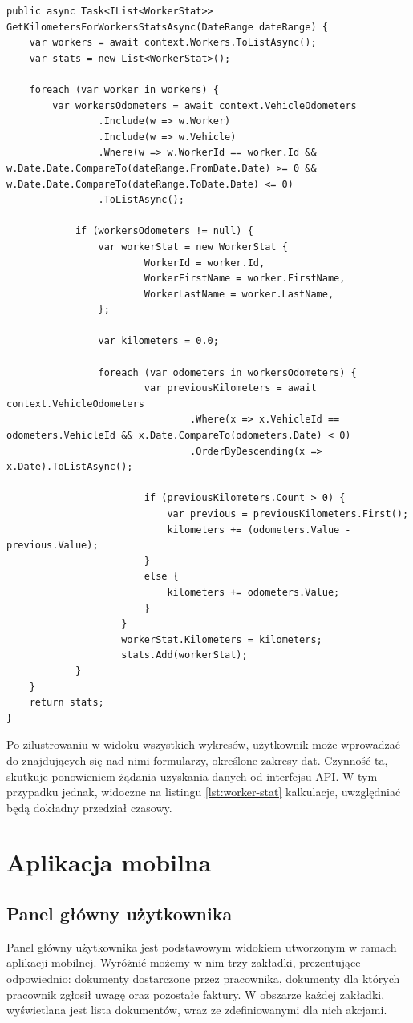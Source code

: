 \begin{lstlisting}[label=lst:worker-stat,caption=Kod metody repozytorium przygotowującej dane dla wykresu kilometrów, captionpos=b,basicstyle=\footnotesize\ttfamily,style=sharpcstyle,language={[Sharp]C}]
public async Task<IList<WorkerStat>> GetKilometersForWorkersStatsAsync(DateRange dateRange) {
	var workers = await context.Workers.ToListAsync();
	var stats = new List<WorkerStat>();

	foreach (var worker in workers) {
		var workersOdometers = await context.VehicleOdometers
				.Include(w => w.Worker)
				.Include(w => w.Vehicle)
				.Where(w => w.WorkerId == worker.Id && w.Date.Date.CompareTo(dateRange.FromDate.Date) >= 0 && w.Date.Date.CompareTo(dateRange.ToDate.Date) <= 0)
				.ToListAsync();

			if (workersOdometers != null) {
				var workerStat = new WorkerStat {
						WorkerId = worker.Id,
						WorkerFirstName = worker.FirstName,
						WorkerLastName = worker.LastName,
				};

				var kilometers = 0.0;
			
				foreach (var odometers in workersOdometers) {
						var previousKilometers = await context.VehicleOdometers
								.Where(x => x.VehicleId == odometers.VehicleId && x.Date.CompareTo(odometers.Date) < 0)
								.OrderByDescending(x => x.Date).ToListAsync();

						if (previousKilometers.Count > 0) {
							var previous = previousKilometers.First();
							kilometers += (odometers.Value - previous.Value);
						}
						else {
							kilometers += odometers.Value;
						}
					}
					workerStat.Kilometers = kilometers;
					stats.Add(workerStat);
			}
	}
	return stats;
}
\end{lstlisting}

Po zilustrowaniu w widoku wszystkich wykresów, użytkownik może wprowadzać do znajdujących się nad nimi formularzy, określone zakresy dat. Czynność ta, skutkuje ponowieniem żądania uzyskania danych od interfejsu API. W tym przypadku jednak, widoczne na listingu \ref{lst:worker-stat} kalkulacje, uwzględniać będą dokładny przedział czasowy.
\section{Aplikacja mobilna}
\subsection{Panel główny użytkownika}
Panel główny użytkownika jest podstawowym widokiem utworzonym w ramach aplikacji mobilnej. Wyróżnić możemy w nim trzy zakładki, prezentujące odpowiednio: dokumenty dostarczone przez pracownika, dokumenty dla których pracownik zgłosił uwagę oraz pozostałe faktury. W obszarze każdej zakładki, wyświetlana jest lista dokumentów, wraz ze zdefiniowanymi dla nich akcjami.

